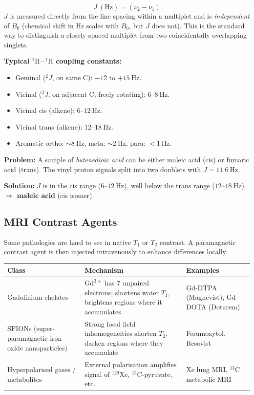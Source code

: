 \documentclass[12pt,a4paper]{article}
\begin{document}
\begin{tcolorbox}[formulabox, title={Coupling Constant \texorpdfstring{$J$}{J}}]
\[
J\ (\mathrm{Hz}) = (\nu_2 - \nu_1)
\]
$J$ is measured directly from the line spacing within a multiplet and is \emph{independent} of $B_0$ (chemical shift in Hz scales with $B_0$, but $J$ does not). This is the standard way to distinguish a closely-spaced multiplet from two coincidentally overlapping singlets.
\end{tcolorbox}

\textbf{Typical $^{1}\mathrm{H}{-}^{1}\mathrm{H}$ coupling constants:}
\begin{itemize}[leftmargin=*, itemsep=1pt, topsep=2pt]
  \item Geminal ($^{2}J$, on same C): $-12$ to $+15\ \mathrm{Hz}$.
  \item Vicinal ($^{3}J$, on adjacent C, freely rotating): $6$--$8\ \mathrm{Hz}$.
  \item Vicinal cis (alkene): $6$--$12\ \mathrm{Hz}$.
  \item Vicinal trans (alkene): $12$--$18\ \mathrm{Hz}$.
  \item Aromatic ortho: $\sim 8\ \mathrm{Hz}$, meta: $\sim 2\ \mathrm{Hz}$, para: $<1\ \mathrm{Hz}$.
\end{itemize}

\begin{tcolorbox}[examplebox, title={Solved Example: Distinguishing Cis and Trans Alkenes from \texorpdfstring{$J$}{J}}]
\textbf{Problem:} A sample of \emph{butenedioic acid} can be either maleic acid (cis) or fumaric acid (trans). The vinyl proton signals split into two doublets with $J=11.6\ \mathrm{Hz}$.

\textbf{Solution:} $J$ is in the cis range ($6$--$12\ \mathrm{Hz}$), well below the trans range ($12$--$18\ \mathrm{Hz}$). $\Rightarrow$ \textbf{maleic acid} (cis isomer).
\end{tcolorbox}

\subsection{MRI Contrast Agents}
Some pathologies are hard to see in native $T_1$ or $T_2$ contrast. A paramagnetic contrast agent is then injected intravenously to enhance differences locally.

\begin{tabularx}{\linewidth}{|B{2.8cm}|Y|Y|}
\hline
\textbf{Class} & \textbf{Mechanism} & \textbf{Examples} \\
\hline
Gadolinium chelates & $\mathrm{Gd^{3+}}$ has 7 unpaired electrons; shortens water $T_1$, brightens regions where it accumulates & Gd-DTPA (Magnevist), Gd-DOTA (Dotarem) \\
\hline
SPIONs (super-paramagnetic iron oxide nanoparticles) & Strong local field inhomogeneities shorten $T_2$, darken regions where they accumulate & Ferumoxytol, Resovist \\
\hline
Hyperpolarised gases / metabolites & External polarisation amplifies signal of $^{129}\mathrm{Xe}$, $^{13}\mathrm{C}$-pyruvate, etc. & Xe lung MRI, $^{13}\mathrm{C}$ metabolic MRI \\
\hline
\end{tabularx}
\end{document}
